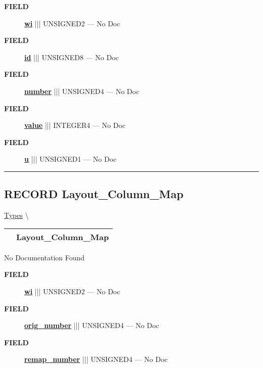 \par
\begin{description}
\item [\colorbox{tagtype}{\color{white} \textbf{\textsf{FIELD}}}] \textbf{\underline{wi}} ||| UNSIGNED2 --- No Doc
\item [\colorbox{tagtype}{\color{white} \textbf{\textsf{FIELD}}}] \textbf{\underline{id}} ||| UNSIGNED8 --- No Doc
\item [\colorbox{tagtype}{\color{white} \textbf{\textsf{FIELD}}}] \textbf{\underline{number}} ||| UNSIGNED4 --- No Doc
\item [\colorbox{tagtype}{\color{white} \textbf{\textsf{FIELD}}}] \textbf{\underline{value}} ||| INTEGER4 --- No Doc
\item [\colorbox{tagtype}{\color{white} \textbf{\textsf{FIELD}}}] \textbf{\underline{u}} ||| UNSIGNED1 --- No Doc
\end{description}





\rule{\linewidth}{0.5pt}
\subsection*{\textsf{\colorbox{headtoc}{\color{white} RECORD}
Layout\_Column\_Map}}

\hypertarget{ecldoc:logisticregression.types.layout_column_map}{}
\hspace{0pt} \hyperlink{ecldoc:LogisticRegression.Types}{Types} \textbackslash 

{\renewcommand{\arraystretch}{1.5}
\begin{tabularx}{\textwidth}{|>{\raggedright\arraybackslash}l|X|}
\hline
\hspace{0pt}\mytexttt{\color{red} } & \textbf{Layout\_Column\_Map} \\
\hline
\end{tabularx}
}

\par





No Documentation Found







\par
\begin{description}
\item [\colorbox{tagtype}{\color{white} \textbf{\textsf{FIELD}}}] \textbf{\underline{wi}} ||| UNSIGNED2 --- No Doc
\item [\colorbox{tagtype}{\color{white} \textbf{\textsf{FIELD}}}] \textbf{\underline{orig\_number}} ||| UNSIGNED4 --- No Doc
\item [\colorbox{tagtype}{\color{white} \textbf{\textsf{FIELD}}}] \textbf{\underline{remap\_number}} ||| UNSIGNED4 --- No Doc
\end{description}





